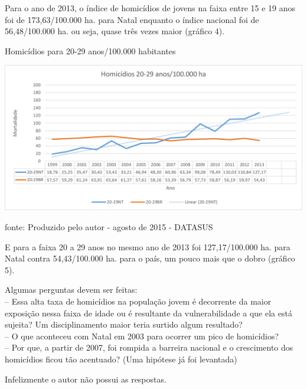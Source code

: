 \documentclass[
	12pt,				%
	openright,			%
	twoside,			%
	a4paper,			%
	chapter=TITLE,		%
	section=TITLE,		%
	subsection=TITLE,	%
	subsubsection=TITLE,%
	spanish,            %
	english,			%
	brazil				%
	]{abntex2}
\begin{document}
\FloatBarrier
\par
Para o ano de 2013, o índice de homicídios de jovens na faixa entre 15 e 19 anos foi de 173,63/100.000 ha. para Natal enquanto o índice nacional foi de 56,48/100.000 ha. ou seja, quase três vezes maior (gráfico 4).
\begin{grafico}[h]
	\begin{center}
		\caption{Homicídios para 20-29 anos/100.000 habitantes}
		\includegraphics[scale=0.5]{juventude-20-29.png}
	\end{center}
	\ABNTEXchapterfont\small{fonte: Produzido pelo autor - agosto de 2015 - DATASUS}
	\label{Homicidios20-29}
\end{grafico}
\FloatBarrier
\par
E para a faixa 20 a 29 anos no mesmo ano de 2013 foi 127,17/100.000 ha. para Natal contra 54,43/100.000 ha. para o país, um pouco mais que o dobro (gráfico 5).
\par
Algumas perguntas devem ser feitas:\\
-- Essa alta taxa de homicídios na população jovem é decorrente da maior exposição nessa faixa de idade ou é resultante da vulnerabilidade a que ela está sujeita? Um disciplinamento maior teria surtido algum resultado?\\
-- O que aconteceu com Natal em 2003 para ocorrer um pico de homicídios? \\
-- Por que, a partir de 2007, foi rompida a barreira nacional e o crescimento dos homicídios ficou tão acentuado? (Uma hipótese já foi levantada)
\par
Infelizmente o autor não possui as respostas.
\end{document}
